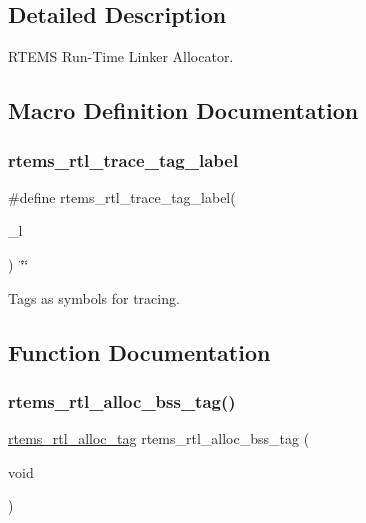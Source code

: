 \subsection{Detailed Description}
R\+T\+E\+MS Run-\/\+Time Linker Allocator. 



\subsection{Macro Definition Documentation}
\mbox{\label{rtl-allocator_8c_a9a79b40c47354c55f8eb12ace1ce7ab5}} 
\subsubsection{\texorpdfstring{rtems\_rtl\_trace\_tag\_label}{rtems\_rtl\_trace\_tag\_label}}
{\footnotesize\ttfamily \#define rtems\+\_\+rtl\+\_\+trace\+\_\+tag\+\_\+label(\begin{DoxyParamCaption}\item[{}]{\+\_\+l }\end{DoxyParamCaption})~\char`\"{}\char`\"{}}

Tags as symbols for tracing. 

\subsection{Function Documentation}
\mbox{\label{rtl-allocator_8c_a031e1d00b848c1d533d292c60fabd10d}} 
\subsubsection{\texorpdfstring{rtems\_rtl\_alloc\_bss\_tag()}{rtems\_rtl\_alloc\_bss\_tag()}}
{\footnotesize\ttfamily \mbox{\hyperlink{rtl-allocator_8h_a445a8615118b7fc14005ab20583153fd}{rtems\+\_\+rtl\+\_\+alloc\+\_\+tag}} rtems\+\_\+rtl\+\_\+alloc\+\_\+bss\+\_\+tag (\begin{DoxyParamCaption}\item[{void}]{ }\end{DoxyParamCaption})}

